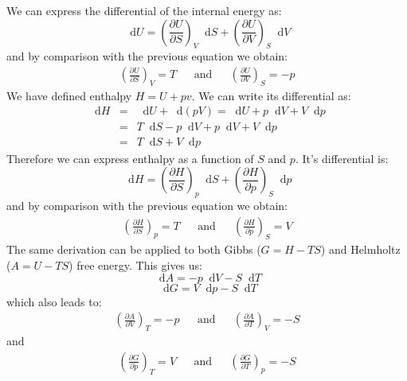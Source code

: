 \documentclass[12pt,a4paper]{report}
\newcommand*\diff{\mathop{}\!\mathrm{d}}
\begin{document}
   We can express the differential of the internal energy as:
   \begin{equation*}
   \diff U=\left(\frac{\partial U}{\partial S}\right)_{V} \diff S+\left(\frac{\partial U}{\partial V}\right)_{S} \diff V
   \end{equation*}
   and by comparison with the previous equation we obtain:
   \begin{align*}
   \left(\frac{\partial U}{\partial S}\right)_{V}=T &&\mathrm{and}&& 
   \left(\frac{\partial U}{\partial V}\right)_{S}=-p
   \end{align*}
   We have defined enthalpy $H = U+pv$. We can write its differential as:
   \begin{eqnarray*}
   \diff H &=& \diff U+\diff(pV)= \diff U+p\diff V + V\diff p \\
   &=&T\diff S-p\diff V+p\diff V + V\diff p\\
   &=& T\diff S+V\diff p
   \end{eqnarray*}
   Therefore we can express enthalpy as a function of $S$ and $p$. It's differential is:
   \begin{equation*}
   \diff H=\left(\frac{\partial H}{\partial S}\right)_{p} \diff S+\left(\frac{\partial H}{\partial p}\right)_{S} \diff p
   \end{equation*}
    and by comparison with the previous equation we obtain:
   \begin{align*}
   \left(\frac{\partial H}{\partial S}\right)_{p}=T &&\mathrm{and}&& 
   \left(\frac{\partial H}{\partial p}\right)_{S}=V
   \end{align*}
   The same derivation can be applied to both Gibbs ($G=H-TS$) and Helmholtz ($A=U-TS$) free energy. This gives us:
   \begin{equation*}
   \diff A= -p \diff V -S \diff T 
   \end{equation*}
   \begin{equation*}
   \diff G= V \diff p-S \diff T
   \end{equation*}
   which also leads to:
   \begin{align*}
   \left(\frac{\partial A}{\partial V}\right)_{T}=-p &&\mathrm{and}&& 
   \left(\frac{\partial A}{\partial T}\right)_{V}=-S
   \end{align*}
   and 
   \begin{align*}
   \left(\frac{\partial G}{\partial p}\right)_{T}=V &&\mathrm{and}&& 
   \left(\frac{\partial G}{\partial T}\right)_{p}=-S
   \end{align*}
\end{document}
